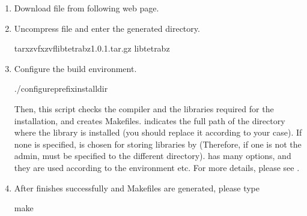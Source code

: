 \documentclass[letterpaper,10pt,pdftex,openany,english]{sphinxmanual}
\begin{document}
\label{\detokenize{install:installation-guide}}\begin{enumerate}
%
\item {} 
\sphinxAtStartPar
Download  file from following web page.

\sphinxAtStartPar
{}

\item {} 
\sphinxAtStartPar
Uncompress  file and enter the generated directory.

\begin{sphinxVerbatim}[commandchars=\\\{\}]
\PYGZdl{}tarxzvfxzvflibtetrabz\PYGZus{}1.0.1.tar.gz
\PYGZdl{}libtetrabz
\end{sphinxVerbatim}

\item {} 
\sphinxAtStartPar
Configure the build environment.

\begin{sphinxVerbatim}[commandchars=\\\{\}]
\PYGZdl{}./configure\PYGZhy{}\PYGZhy{}prefixinstall\PYGZus{}dir
\end{sphinxVerbatim}

\sphinxAtStartPar
Then, this script checks the compiler and the libraries required for the installation,
and creates Makefiles.
 indicates the full path of the directory where the library is installed
(you should replace it according to your case).
If none is specified,  is chosen for storing libraries
by   (Therefore, if one is not the admin,  must be specified to
the different directory).
 has many options, and they are used according to the environment etc.
For more details, please see {\hyperref[\detokenize{install:configoption}]{}}.

\item {} 
\sphinxAtStartPar
After  finishes successfully and Makefiles are generated,
please type

\begin{sphinxVerbatim}[commandchars=\\\{\}]
\PYGZdl{}make
\end{sphinxVerbatim}


\end{enumerate}
\end{document}
